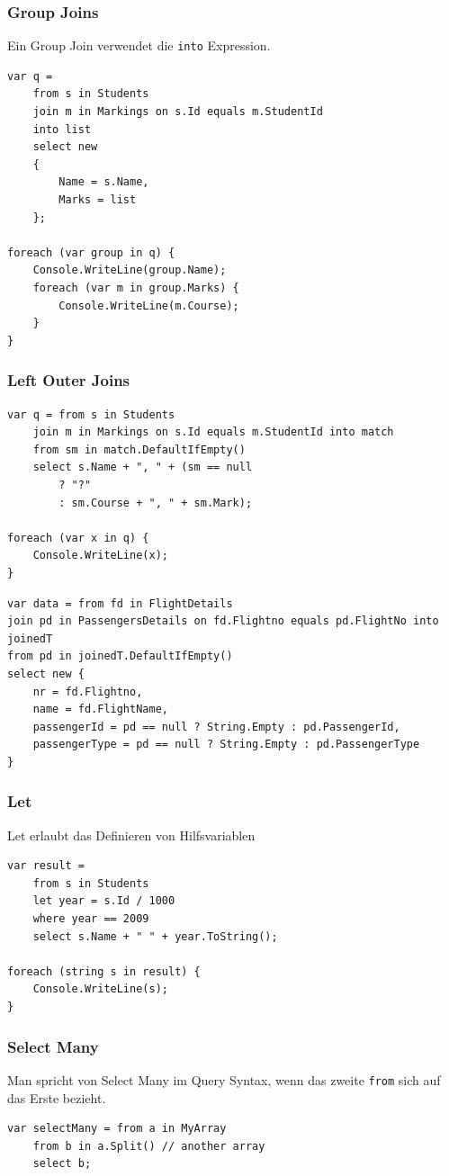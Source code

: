 \subsubsection{Group Joins}
Ein Group Join verwendet die \lstinline|into| Expression.
\begin{lstlisting}
var q =
	from s in Students
	join m in Markings on s.Id equals m.StudentId
	into list
	select new
	{
		Name = s.Name,
		Marks = list
	};
	
foreach (var group in q) {
	Console.WriteLine(group.Name);
	foreach (var m in group.Marks) {
		Console.WriteLine(m.Course);
	}
}
\end{lstlisting}

\subsubsection{Left Outer Joins}
\begin{lstlisting}
var q = from s in Students
	join m in Markings on s.Id equals m.StudentId into match
	from sm in match.DefaultIfEmpty()
	select s.Name + ", " + (sm == null
		? "?"
		: sm.Course + ", " + sm.Mark);
		
foreach (var x in q) {
	Console.WriteLine(x);
}
\end{lstlisting}

\begin{lstlisting}
var data = from fd in FlightDetails
join pd in PassengersDetails on fd.Flightno equals pd.FlightNo into joinedT
from pd in joinedT.DefaultIfEmpty()
select new {
	nr = fd.Flightno,
	name = fd.FlightName,
	passengerId = pd == null ? String.Empty : pd.PassengerId,
	passengerType = pd == null ? String.Empty : pd.PassengerType
}
\end{lstlisting}

\clearpage

\subsubsection{Let}
Let erlaubt das Definieren von Hilfsvariablen
\begin{lstlisting}
var result =
	from s in Students
	let year = s.Id / 1000
	where year == 2009
	select s.Name + " " + year.ToString();

foreach (string s in result) {
	Console.WriteLine(s);
}
\end{lstlisting}


\subsubsection{Select Many}
Man spricht von Select Many im Query Syntax, wenn das zweite \lstinline|from| sich auf das Erste bezieht.
\begin{lstlisting}
var selectMany = from a in MyArray
	from b in a.Split() // another array
	select b;
\end{lstlisting}

